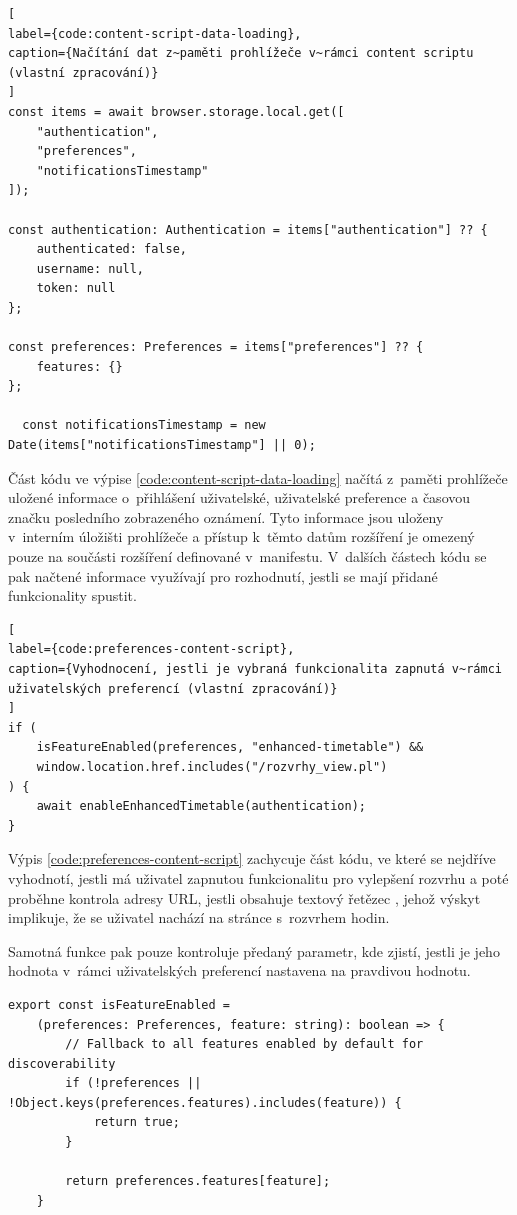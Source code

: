 \begin{lstlisting}[
label={code:content-script-data-loading}, 
caption={Načítání dat z~paměti prohlížeče v~rámci content scriptu (vlastní zpracování)}
]
const items = await browser.storage.local.get([
    "authentication",
    "preferences",
    "notificationsTimestamp"
]);

const authentication: Authentication = items["authentication"] ?? {
    authenticated: false,
    username: null,
    token: null
};

const preferences: Preferences = items["preferences"] ?? {
    features: {}
};

  const notificationsTimestamp = new Date(items["notificationsTimestamp"] || 0);
\end{lstlisting}

 Část kódu ve výpise \ref{code:content-script-data-loading} načítá z~paměti prohlížeče uložené informace o~přihlášení uživatelské, uživatelské preference a časovou značku posledního zobrazeného oznámení. Tyto informace jsou uloženy v~interním úložišti prohlížeče a přístup k~těmto datům rozšíření je omezený pouze na součásti rozšíření definované v~manifestu.
V~dalších částech kódu se pak načtené informace využívají pro rozhodnutí, jestli se mají přidané funkcionality spustit.

\begin{lstlisting}[
label={code:preferences-content-script}, 
caption={Vyhodnocení, jestli je vybraná funkcionalita zapnutá v~rámci uživatelských preferencí (vlastní zpracování)}
]
if (
    isFeatureEnabled(preferences, "enhanced-timetable") && 
    window.location.href.includes("/rozvrhy_view.pl")
) {
    await enableEnhancedTimetable(authentication);
}
\end{lstlisting}

Výpis \ref{code:preferences-content-script} zachycuje část kódu, ve které se nejdříve vyhodnotí, jestli má uživatel zapnutou funkcionalitu pro vylepšení rozvrhu a poté proběhne kontrola adresy URL, jestli obsahuje textový řetězec , jehož výskyt implikuje, že se uživatel nachází na stránce s~rozvrhem hodin.

Samotná funkce  pak pouze kontroluje předaný parametr, kde zjistí, jestli je jeho hodnota v~rámci uživatelských preferencí nastavena na pravdivou hodnotu.

\begin{lstlisting}[label={code:is-feature-enabled}, caption={Definice funkce \code{isFeatureEnabled} (vlastní zpracování)}]
export const isFeatureEnabled = 
    (preferences: Preferences, feature: string): boolean => {
        // Fallback to all features enabled by default for discoverability
        if (!preferences ||  !Object.keys(preferences.features).includes(feature)) {
            return true;
        }
    
        return preferences.features[feature];
    }
\end{lstlisting}

